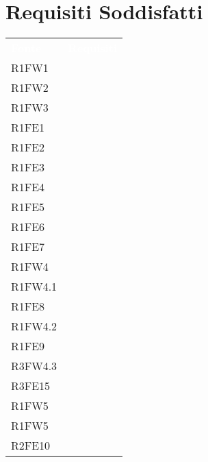 \section{Requisiti Soddisfatti}

\begin{table}[!htbp]
\renewcommand{\arraystretch}{1.5}
\begin{tabular}[t]{ m{}<{\centering}  m{}<{\centering} }
	\rowcolor{darkblue}
	\textcolor{white}{\textbf{Fonte}} &\textcolor{white}{\textbf{Requisiti}}\\ 

	R1FW1 & \So \\	
	 
	R1FW2 & \So \\	

	R1FW3 & \So \\	
	 
	R1FE1 & \So \\	
	 
	R1FE2 & \So \\	
	 
	R1FE3 & \So \\	

	R1FE4 & \So \\	
	
	R1FE5 & \So \\
	 
	R1FE6 & \So \\	 
	 
	R1FE7 & \So \\	

	R1FW4 & \So \\ 
	 
	R1FW4.1& \Ns \\	
	 
	R1FE8 & \Ns \\	
	 
	R1FW4.2 & \Ns \\		 

	R1FE9 & \Ns \\		
	 
	R3FW4.3 & \So \\				
	 
	R3FE15 & \So \\			
	  	 	 	
	R1FW5 & \So \\		
	 
	R1FW5 & \So \\
	
	R2FE10 & \Ns \\
	

\end{tabular}
\end{table}
